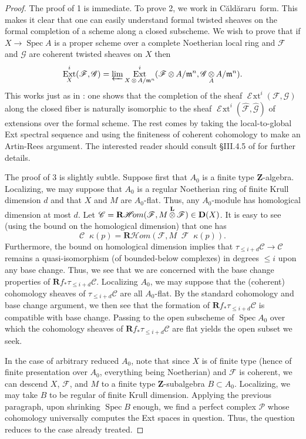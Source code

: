 \documentclass[11pt]{amsart}
\newcommand{\Caldararu}{C\u ald\u araru}
\newcommand{\field}[1]{\mathbf #1}
\newcommand{\mf}[1]{\mathfrak #1}
\newcommand{\ms}[1]{\mathscr #1}
\newcommand{\R}{\field R}
\newcommand{\Z}{\field Z}
\newcommand{\shom}{\ms H\!om}
\newcommand{\rshom}{\mathbf{R}\shom}
\newcommand{\spec}{\operatorname{Spec}}
\DeclareMathOperator{\ext}{\operatorname{Ext}}
\DeclareMathOperator{\sext}{\ms E\!xt}
\DeclareMathOperator{\D}{\operatorname{\bf D}}
\renewcommand{\[}{[\!\hspace{0.03em}[}
\renewcommand{\]}{]\!\hspace{0.03em}]}
\renewcommand{\(}{(\!\hspace{0.03em}(}
\renewcommand{\)}{)\!\hspace{0.03em})}
\DeclareMathOperator*{\tensor}{\otimes}
\DeclareMathOperator*{\ltensor}{\stackrel{\field L}{\otimes}}
\newcommand{\invlim}{\varprojlim}
\theoremstyle{definition}
\theoremstyle{remark}
\begin{document}
\begin{proof}  The proof of 1 is immediate.  To prove 2, we work in 
\Caldararu\ form.  This makes it clear that one can easily understand 
formal twisted sheaves on the formal completion of a scheme along a 
closed subscheme.  We wish to prove that if $X\to\spec A$ is a proper 
scheme over a complete Noetherian local ring and $\ms F$ and $\ms G$ 
are coherent twisted sheaves on $X$ then $$\ext^{i}_{X}(\ms F,\ms 
G)=\invlim\ext^{i}_{X\tensor A/\mf m^{n}}(\ms F\tensor A/\mf m^{n},\ms 
G\tensor_{A}A/\mf m^{n}).$$  This works just as in \cite[4.5]{ega3-1}: one 
shows that the completion of the sheaf $\sext^{i}(\ms F,\ms G)$ along 
the closed fiber is naturally isomorphic to the sheaf 
$\sext^{i}(\widehat{\ms F},\widehat{\ms G})$ of extensions over the 
formal scheme.  The rest comes by taking the local-to-global Ext 
spectral sequence and using the finiteness of coherent cohomology to 
make an Artin-Rees argument.  The interested reader should consult 
\S III.4.5 of \cite{ega3-1} for further details.

The proof of 3 is slightly subtle.  Suppose first that $A_{0}$ is a 
finite type $\Z$-algebra.  Localizing, we may suppose that $A_{0}$ is 
a regular Noetherian ring of finite Krull dimension $d$ and that $X$ 
and $M$ are $A_{0}$-flat.  Thus, any 
$A_{0}$-module has homological dimension at most $d$.  Let $\ms 
C=\rshom(\ms F,M\ltensor\ms F)\in\D(X)$.  It is easy to see (using the 
bound on the homological dimension) that one has $$\ms C\ltensor 
\kappa(p)=\rshom(\ms F,M\ltensor\ms F\ltensor\kappa(p)).$$  
Furthermore, the bound on homological dimension implies that 
$\tau_{\leq i+d}\ms C\to\ms C$ remains a quasi-isomorphism (of 
bounded-below complexes) in 
degrees $\leq i$ upon any base change.  Thus, we see that we are 
concerned with the base change properties of $\R f_{\ast}\tau_{\leq 
i+d}\ms C$.  Localizing $A_{0}$, we may suppose that the (coherent) 
cohomology sheaves of $\tau_{\leq i+d}\ms C$ are all $A_{0}$-flat.  
By the standard cohomology and base change argument, we then see that the 
formation of $\R f_{\ast}\tau_{\leq i+d}\ms C$ is compatible with base 
change.  Passing to the open subscheme of $\spec A_{0}$ over which the 
cohomology sheaves of $\R f_{\ast}\tau_{\leq i+d}\ms C$ are flat 
yields the open subset we seek.

In the case of arbitrary reduced $A_{0}$, note that since $X$ is of 
finite type (hence of finite presentation over $A_{0}$, everything 
being Noetherian) and $\ms F$ is coherent, we can descend $X$,  
$\ms F$, and $M$ to a finite type $\Z$-subalgebra $B\subset A_{0}$.  
Localizing, we may take $B$ to be regular of finite Krull dimension.  
Applying the previous paragraph, upon shrinking $\spec B$ enough, we 
find a perfect complex $\ms P$ whose cohomology universally computes 
the Ext spaces in question.  Thus, the question reduces to the case 
already treated.
\end{proof}
\end{document}
